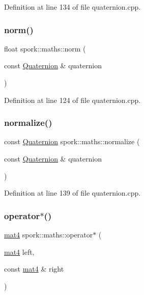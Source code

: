 Definition at line 134 of file quaternion.\+cpp.

\mbox{\label{namespacespork_1_1maths_a141bfeeb49979c58682a3088bfdbc329}} 
\subsubsection{\texorpdfstring{norm()}{norm()}}
{\footnotesize\ttfamily float spork\+::maths\+::norm (\begin{DoxyParamCaption}\item[{const \hyperlink{structspork_1_1maths_1_1_quaternion}{Quaternion} \&}]{quaternion }\end{DoxyParamCaption})}



Definition at line 124 of file quaternion.\+cpp.

\mbox{\label{namespacespork_1_1maths_aa510abe7e7c68b015aa45c046395967a}} 
\subsubsection{\texorpdfstring{normalize()}{normalize()}}
{\footnotesize\ttfamily const \hyperlink{structspork_1_1maths_1_1_quaternion}{Quaternion} spork\+::maths\+::normalize (\begin{DoxyParamCaption}\item[{const \hyperlink{structspork_1_1maths_1_1_quaternion}{Quaternion} \&}]{quaternion }\end{DoxyParamCaption})}



Definition at line 139 of file quaternion.\+cpp.

\mbox{\label{namespacespork_1_1maths_a88480b4756d668f2679cdb861e20225c}} 
\subsubsection{\texorpdfstring{operator$\ast$()}{operator*()}\hspace{0.1cm}{\footnotesize\ttfamily [1/8]}}
{\footnotesize\ttfamily \hyperlink{structspork_1_1maths_1_1mat4}{mat4} spork\+::maths\+::operator$\ast$ (\begin{DoxyParamCaption}\item[{\hyperlink{structspork_1_1maths_1_1mat4}{mat4}}]{left,  }\item[{const \hyperlink{structspork_1_1maths_1_1mat4}{mat4} \&}]{right }\end{DoxyParamCaption})}



